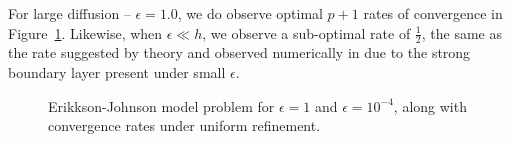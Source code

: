 For large diffusion -- $\epsilon = 1.0$, we do observe optimal $p+1$ rates of convergence in Figure~\ref{fig:erikkson2}.  Likewise, when $\epsilon \ll h$, we observe a sub-optimal rate of $\frac{1}{2}$, the same as the rate suggested by theory and observed numerically in \cite{broersenStevenson} due to the strong boundary layer present under small $\epsilon$.  
\begin{figure}[!h]
\centering
{}
\caption{Erikkson-Johnson model problem for $\epsilon = 1$ and $\epsilon = 10^{-4}$, along with convergence rates under uniform refinement.}
\label{fig:erikkson2}
\end{figure}

